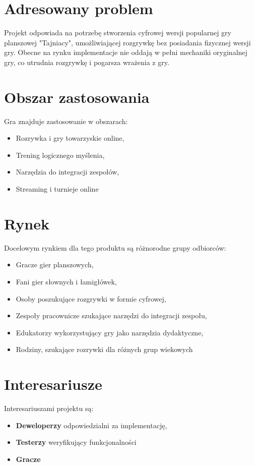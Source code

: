 \documentclass[12pt,a4paper,colorlinks=true,linkcolor=NavyBlue,citecolor=red,urlcolor=NavyBlue]{book}
\begin{document}
\section{Adresowany problem}
Projekt odpowiada na potrzebę stworzenia cyfrowej wersji popularnej gry planszowej "Tajniacy", umożliwiającej rozgrywkę bez posiadania fizycznej wersji gry. Obecne na rynku implementacje nie oddają w pełni mechaniki oryginalnej gry, co utrudnia rozgrywkę i pogarsza wrażenia z gry.

\section{Obszar zastosowania}
Gra znajduje zastosowanie w obszarach:
\begin{itemize}
    \item Rozrywka i gry towarzyskie online, 
    \item Trening logicznego myślenia, 
    \item Narzędzia do integracji zespołów,
    \item Streaming i turnieje online
\end{itemize}

\section{Rynek}
Docelowym rynkiem dla tego produktu są różnorodne grupy odbiorców:
\begin{itemize}
    \item Gracze gier planszowych, 
    \item Fani gier słownych i łamigłówek, 
    \item Osoby poszukujące rozgrywki w formie cyfrowej, 
    \item Zespoły pracownicze szukające narzędzi do integracji zespołu,
    \item Edukatorzy wykorzystujący gry jako narzędzia dydaktyczne,
    \item Rodziny, szukające rozrywki dla różnych grup wiekowych
\end{itemize}

\section{Interesariusze}
Interesariuszami projektu są:
\begin{itemize}
    \item \textbf{Deweloperzy} odpowiedzialni za implementację, 
    \item \textbf{Testerzy} weryfikujący funkcjonalności 
    \item \textbf{Gracze}
\end{itemize}
\end{document}
